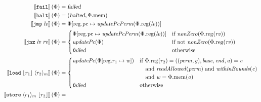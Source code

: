 \documentclass[a4paper]{article}
\newcommand{\update}[2]{[#1 \mapsto #2]}
\newcommand{\sem}[1]{\left\llbracket #1 \right\rrbracket}
\newcommand{\var}[1]{\mathit{#1}}
\newcommand{\rv}{\var{rv}}
\newcommand{\lv}{\var{lv}}
\newcommand{\gl}{\var{g}}
\newcommand{\pcreg}{\mathrm{pc}}
\newcommand{\addr}{\var{a}}
\newcommand{\start}{\var{base}}
\newcommand{\addrend}{\var{end}}
\newcommand{\perm}{\var{perm}}
\newcommand{\stdcap}[1][(\perm,\gl)]{\left(#1,\start,\addrend,\addr \right)}
\newcommand{\plainproj}[1]{\mathrm{#1}}
\newcommand{\memheap}[1][\Phi]{#1.\plainproj{mem}}
\newcommand{\memreg}[1][\Phi]{#1.\plainproj{reg}}
\newcommand{\updateReg}[3][\Phi]{#1\update{\plainproj{reg}.#2}{#3}}
\newcommand{\failed}{\textsl{failed}}
\newcommand{\halted}{\textsl{halted}}
\newcommand{\plainfun}[2]{
  \ifthenelse{\equal{#2}{}}
  {\mathit{#1}}
  {\mathit{#1}(#2)}
}
\newcommand{\updatePcPerm}[1]{\plainfun{updatePcPerm}{#1}}
\newcommand{\nonZero}[1]{\plainfun{nonZero}{#1}}
\newcommand{\readAllowed}[1]{\plainfun{readAllowed}{#1}}
\newcommand{\withinBounds}[1]{\plainfun{withinBounds}{#1}}
\newcommand{\stdUpdatePc}[1]{\plainfun{updatePc}{#1}}
\newcommand{\refreg}[1]{\lfloor #1 \rfloor}
\newcommand{\refheap}[1]{\langle #1 \rangle_m}
\newcommand{\zinstr}[1]{\mathtt{#1}}
\newcommand{\fail}{\zinstr{fail}}
\newcommand{\halt}{\zinstr{halt}}
\newcommand{\oneinstr}[2]{\zinstr{#1} \; #2}
\newcommand{\jmp}[1]{\oneinstr{jmp}{#1}}
\newcommand{\twoinstr}[3]{\zinstr{#1} \; #2 \; #3}
\newcommand{\jnz}[2]{\twoinstr{jnz}{#1}{#2}}
\newcommand{\store}[2]{\twoinstr{store}{#1}{#2}}
\newcommand{\load}[2]{\twoinstr{load}{#1}{#2}}
\begin{document}
\begin{align*}
  \sem{\fail}(\Phi)                        & = \failed \\
  \sem{\halt}(\Phi)                        & = (\halted,\memheap) \\
  \sem{\jmp{\lv}}(\Phi)                    & = \updateReg{\pcreg}{\updatePcPerm{\memreg(\lv)}} \\
  \sem{\jnz{\lv}{\rv}}(\Phi)               & = 
                                             \begin{cases}
                                               \updateReg{\pcreg}{\updatePcPerm{\memreg(\lv)}} &
                                               \arraycolsep=0pt
                                               \begin{array}[t]{l}
                                                 \text{if $\nonZero{\memreg(\rv)}$} 
                                               \end{array}\\
                                               \stdUpdatePc{\Phi} & \text{if not $\nonZero{\memreg(\rv)}$}\\
                                               \failed & \text{otherwise }
                                             \end{cases} \\
  \sem{\load{\refreg{r_1}}{\refheap{r_2}}}(\Phi)  & = 
                                              \begin{cases}
                                                \stdUpdatePc{\updateReg{r_1}{\var{w}}} &
                                                \arraycolsep=0pt
                                                \begin{array}[t]{l}
                                                  \text{if }\memreg(r_2) = \stdcap = \var{c} \\
                                                  \quad\text{and }\readAllowed{\perm} \text{ and } \withinBounds{\var{c}} \\
                                                  \quad\text{and }\var{w} = \memheap(\addr)
                                                \end{array}\\
                                                \failed & \text{otherwise }
                                              \end{cases}\\
  \sem{\store{\refheap{r_1}}{\refreg{r_2}}}(\Phi) & = 

\end{align*}
\end{document}
